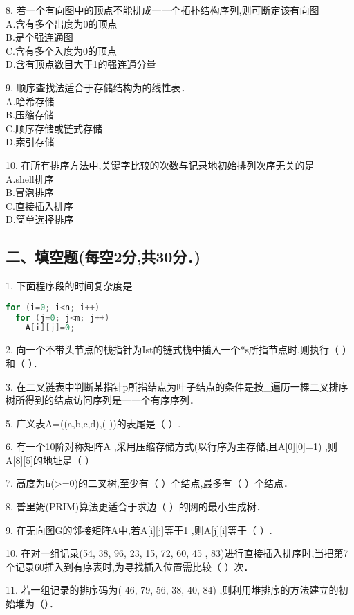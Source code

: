 8. 若一个有向图中的顶点不能排成一一个拓扑结构序列,则可断定该有向图 \\
A.含有多个出度为0的顶点 \\
B.是个强连通图 \\
C.含有多个入度为0的顶点 \\
D.含有顶点数目大于1的强连通分量

9. 顺序查找法适合于存储结构为的线性表． \\
A.哈希存储 \\
B.压缩存储 \\
C.顺序存储或链式存储 \\
D.索引存储

10. 在所有排序方法中,关键字比较的次数与记录地初始排列次序无关的是_ \\
A.shell排序 \\
B.冒泡排序 \\
C.直接插入排序 \\
D.简单选择排序

\subsection{二、填空题(每空2分,共30分．)}

1. 下面程序段的时间复杂度是
\begin{lstlisting}[language=cpp]
for (i=0; i<n; i++)
  for (j=0; j<m; j++)
    A[i][j]=0;
\end{lstlisting}

2. 向一个不带头节点的栈指针为Ist的链式栈中插入一个*s所指节点时,则执行（   ）和（    ）．

3. 在二叉链表中判断某指针p所指结点为叶子结点的条件是按_遍历一棵二叉排序树所得到的结点访问序列是一一个有序序列．

5. 广义表A=((a,b,c,d),( ))的表尾是（    ）.

6. 有一个10阶对称矩阵A ,采用压缩存储方式(以行序为主存储,且A[0][0]=1) ,则A[8][5]的地址是（    ）

7. 高度为h(>=0)的二叉树,至少有（    ）个结点,最多有（    ）个结点．

8. 普里姆(PRIM)算法更适合于求边（    ）的网的最小生成树．

9. 在无向图G的邻接矩阵A中,若A[i][j]等于1 ,则A[j][i]等于（    ）.

10. 在对一组记录(54, 38, 96, 23, 15, 72, 60, 45 , 83)进行直接插入排序时,当把第7个记录60插入到有序表时,为寻找插入位置需比较（    ）次．

11. 若一组记录的排序码为( 46, 79, 56, 38, 40, 84) ,则利用堆排序的方法建立的初始堆为（）．

